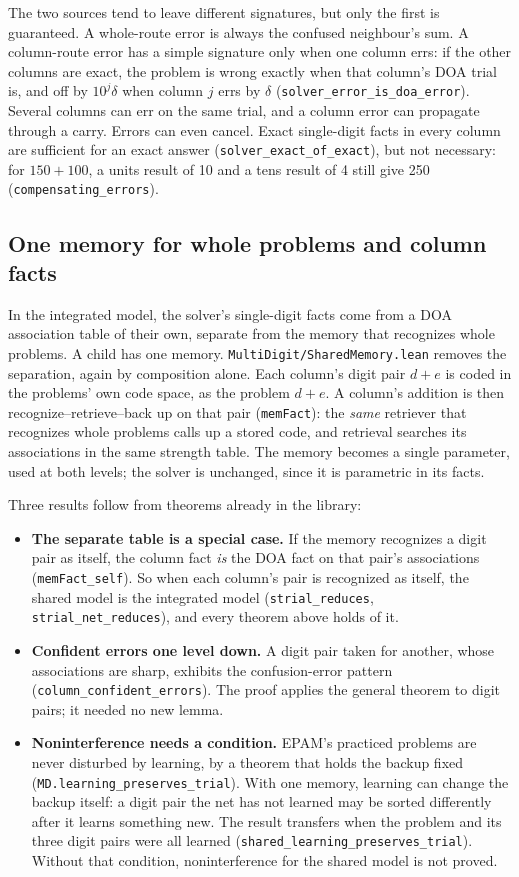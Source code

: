 \documentclass[11pt]{article}
\newcommand{\code}[1]{\texttt{#1}}
\newcommand{\lean}[1]{\texttt{#1}}
\begin{document}
The two sources tend to leave different signatures, but only the first is guaranteed. A whole-route error is always the confused neighbour's sum. A column-route error has a simple signature only when one column errs: if the other columns are exact, the problem is wrong exactly when that column's DOA trial is, and off by $10^j\delta$ when column $j$ errs by $\delta$ (\lean{solver\_error\_is\_doa\_error}). Several columns can err on the same trial, and a column error can propagate through a carry. Errors can even cancel. Exact single-digit facts in every column are sufficient for an exact answer (\lean{solver\_exact\_of\_exact}), but not necessary: for $150+100$, a units result of 10 and a tens result of 4 still give 250 (\lean{compensating\_errors}).

\subsection{One memory for whole problems and column facts}
\label{sec:shared}

In the integrated model, the solver's single-digit facts come from a DOA association table of their own, separate from the memory that recognizes whole problems. A child has one memory. \code{MultiDigit/SharedMemory.lean} removes the separation, again by composition alone. Each column's digit pair $d+e$ is coded in the problems' own code space, as the problem $d+e$. A column's addition is then recognize--retrieve--back up on that pair (\lean{memFact}): the \emph{same} retriever that recognizes whole problems calls up a stored code, and retrieval searches its associations in the same strength table. The memory becomes a single parameter, used at both levels; the solver is unchanged, since it is parametric in its facts.

Three results follow from theorems already in the library:
\begin{itemize}
  \item \textbf{The separate table is a special case.} If the memory recognizes a digit pair as itself, the column fact \emph{is} the DOA fact on that pair's associations (\lean{memFact\_self}). So when each column's pair is recognized as itself, the shared model is the integrated model (\lean{strial\_reduces}, \lean{strial\_net\_reduces}), and every theorem above holds of it.
  \item \textbf{Confident errors one level down.} A digit pair taken for another, whose associations are sharp, exhibits the confusion-error pattern (\lean{column\_confident\_errors}). The proof applies the general theorem to digit pairs; it needed no new lemma.
  \item \textbf{Noninterference needs a condition.} EPAM's practiced problems are never disturbed by learning, by a theorem that holds the backup fixed (\lean{MD.learning\_preserves\_trial}). With one memory, learning can change the backup itself: a digit pair the net has not learned may be sorted differently after it learns something new. The result transfers when the problem and its three digit pairs were all learned (\lean{shared\_learning\_preserves\_trial}). Without that condition, noninterference for the shared model is not proved.
\end{itemize}
\end{document}
